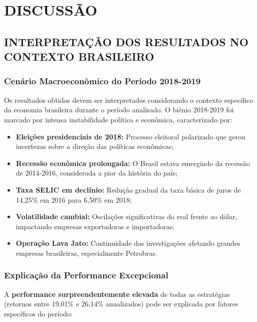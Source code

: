 
\chapter{DISCUSSÃO}

\section{INTERPRETAÇÃO DOS RESULTADOS NO CONTEXTO BRASILEIRO}

\subsection{Cenário Macroeconômico do Período 2018-2019}

Os resultados obtidos devem ser interpretados considerando o contexto específico da economia brasileira durante o período analisado. O biênio 2018-2019 foi marcado por intensa instabilidade política e econômica, caracterizado por:

\begin{itemize}
    \item \textbf{Eleições presidenciais de 2018:} Processo eleitoral polarizado que gerou incertezas sobre a direção das políticas econômicas;
    \item \textbf{Recessão econômica prolongada:} O Brasil estava emergindo da recessão de 2014-2016, considerada a pior da história do país;
    \item \textbf{Taxa SELIC em declínio:} Redução gradual da taxa básica de juros de 14,25\% em 2016 para 6,50\% em 2018;
    \item \textbf{Volatilidade cambial:} Oscilações significativas do real frente ao dólar, impactando empresas exportadoras e importadoras;
    \item \textbf{Operação Lava Jato:} Continuidade das investigações afetando grandes empresas brasileiras, especialmente Petrobras.
\end{itemize}

\subsection{Explicação da Performance Excepcional}

A \textbf{performance surpreendentemente elevada} de todas as estratégias (retornos entre 19,01\% e 26,14\% anualizados) pode ser explicada por fatores específicos do período:

